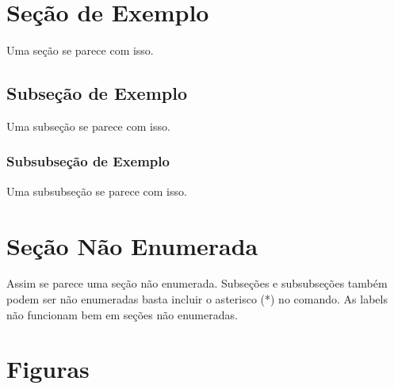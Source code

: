 


\section{Seção de Exemplo} %
\label{sec:e1}

    Uma seção se parece com isso.


\subsection{Subseção de Exemplo} %
\label{sec:e2}

    Uma subseção se parece com isso.


\subsubsection{Subsubseção de Exemplo} %
\label{sec:e3}

    Uma subsubseção se parece com isso.


\section*{Seção Não Enumerada} %

    Assim se parece uma seção não enumerada.
    Subseções e subsubseções também podem ser não enumeradas basta incluir o asterisco (*) no comando.
    As labels não funcionam bem em seções não enumeradas.


\section{Figuras}
\label{sec:figuras}


